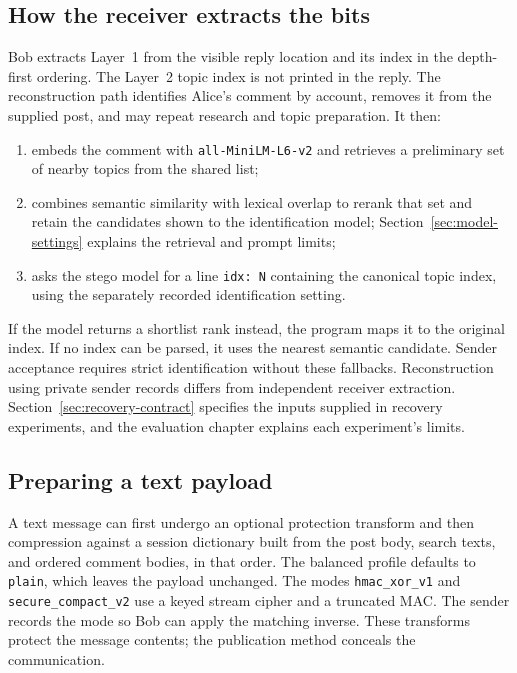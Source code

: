 \subsection{How the receiver extracts the bits}
Bob extracts Layer~1 from the visible reply location and its index in the depth-first ordering.
The Layer~2 topic index is not printed in the reply.
The reconstruction path identifies Alice's comment by account, removes it from the supplied post, and may repeat research and topic preparation. It then:
\begin{enumerate}
\item embeds the comment with \texttt{all-MiniLM-L6-v2} and retrieves a preliminary set of nearby topics from the shared list;
\item combines semantic similarity with lexical overlap to rerank that set and retain the candidates shown to the identification model; Section~\ref{sec:model-settings} explains the retrieval and prompt limits;
\item asks the stego model for a line \texttt{idx: N} containing the canonical topic index, using the separately recorded identification setting.
\end{enumerate}
If the model returns a shortlist rank instead, the program maps it to the original index. If no index can be parsed, it uses the nearest semantic candidate. Sender acceptance requires strict identification without these fallbacks.
Reconstruction using private sender records differs from independent receiver extraction. Section~\ref{sec:recovery-contract} specifies the inputs supplied in recovery experiments, and the evaluation chapter explains each experiment's limits.

\subsection{Preparing a text payload}
\label{sec:compression}
A text message can first undergo an optional protection transform and then compression against a session dictionary built from the post body, search texts, and ordered comment bodies, in that order.
The balanced profile defaults to \texttt{plain}, which leaves the payload unchanged.
The modes \texttt{hmac\_xor\_v1} and \texttt{secure\_compact\_v2} use a keyed stream cipher and a truncated MAC. The sender records the mode so Bob can apply the matching inverse.
These transforms protect the message contents; the publication method conceals the communication.

